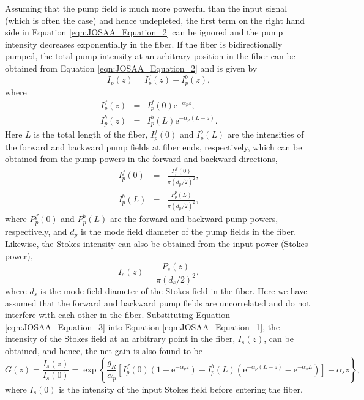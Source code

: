 Assuming that the pump field is much more powerful than the input signal (which is often the case) and hence undepleted, the first term on the right hand side in Equation \eqref{eqn:JOSAA_Equation_2} can be ignored and the pump intensity decreases exponentially in the fiber. If the fiber is bidirectionally pumped, the total pump intensity at an arbitrary position in the fiber can be obtained from Equation \eqref{eqn:JOSAA_Equation_2} and is given by
\begin{equation}
I_p(z) = I_p^f(z) + I_p^b(z),\label{eqn:JOSAA_Equation_3}
\end{equation}
where 
\begin{eqnarray}
I_p^f(z) &=& I_p^f(0) \mathrm{e}^{-\alpha_p z},\label{eqn:JOSAA_Equation_4a}\\
I_p^b(z) &=& I_p^b(L) \mathrm{e}^{-\alpha_p (L-z)}.\label{eqn:JOSAA_Equation_4b}
\end{eqnarray}
Here $L$ is the total length of the fiber, $I_p^f(0)$ and $I_p^b(L)$ are the intensities of the forward and backward pump fields at fiber ends, respectively, which can be obtained from the pump powers in the forward and backward directions,
\begin{eqnarray}
I_p^f(0) &=& \frac{P_p^f(0)}{\pi(d_p/2)^2},\label{eqn:JOSAA_Equation_5a}\\
I_p^b(L) &=& \frac{P_p^b(L)}{\pi(d_p/2)^2},\label{eqn:JOSAA_Equation_5b}
\end{eqnarray}
where $P_p^f(0)$ and $P_p^b(L)$ are the forward and backward pump powers, respectively, and $d_p$ is the mode field diameter of the pump fields in the fiber. Likewise, the Stokes intensity can also be obtained from the input power (Stokes power),
\begin{equation}
I_s(z) = \frac{P_s(z)}{\pi(d_s/2)^2},\label{eqn:JOSAA_Equation_6}
\end{equation}
where $d_s$ is the mode field diameter of the Stokes field in the fiber. Here we have assumed that the forward and backward pump fields are uncorrelated and do not interfere with each other in the fiber.
Substituting Equation \eqref{eqn:JOSAA_Equation_3} into Equation \eqref{eqn:JOSAA_Equation_1}, the intensity of the Stokes field at an arbitrary point in the fiber, $I_s(z)$, can be obtained, and hence, the net gain is also found to be
\begin{equation}
G(z)=\frac{I_s(z)}{I_s(0)}=\exp\left\{\frac{g_R}{\alpha_p} \left[I_{p}^f(0)\left(1-\mathrm{e}^{-\alpha_p z}\right)+I_{p}^b(L)\left(\mathrm{e}^{-\alpha_p (L-z)}-\mathrm{e}^{-\alpha_p L}\right)\right]- \alpha_s z\right\},\label{eqn:JOSAA_Equation_7}
\end{equation}
where $I_s(0)$ is the intensity of the input Stokes field before entering the fiber.

